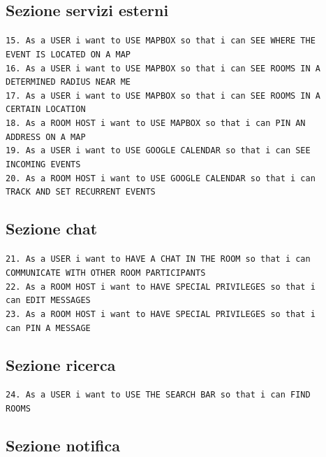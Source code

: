 	\subsection{Sezione servizi esterni}
	\texttt{15. As a USER i want to USE MAPBOX so that i can SEE WHERE THE \\ EVENT IS LOCATED ON A MAP}\\
	\texttt{16. As a USER i want to USE MAPBOX so that i can SEE ROOMS IN A \\ DETERMINED RADIUS NEAR ME}\\
	\texttt{17. As a USER i want to USE MAPBOX so that i can SEE ROOMS IN A \\ CERTAIN LOCATION}\\
	\texttt{18. As a ROOM HOST i want to USE MAPBOX so that i can PIN AN \\ ADDRESS ON A MAP}\\
	\texttt{19. As a USER i want to USE GOOGLE CALENDAR so that i can SEE \\ INCOMING EVENTS}\\
	\texttt{20. As a ROOM HOST i want to USE GOOGLE CALENDAR so that i can \\ TRACK AND SET RECURRENT EVENTS}
	
	
	\subsection{Sezione chat}
	\texttt{21. As a USER i want to HAVE A CHAT IN THE ROOM so that i can \\ COMMUNICATE WITH OTHER ROOM PARTICIPANTS}\\
	\texttt{22. As a ROOM HOST i want to HAVE SPECIAL PRIVILEGES so that i \\ can EDIT MESSAGES}\\
	\texttt{23. As a ROOM HOST i want to HAVE SPECIAL PRIVILEGES so that i \\ can PIN A MESSAGE}
	
	\subsection{Sezione ricerca}
	\texttt{24. As a USER i want to USE THE SEARCH BAR so that i can FIND \\ ROOMS}
	
	\subsection{Sezione notifica}
	
